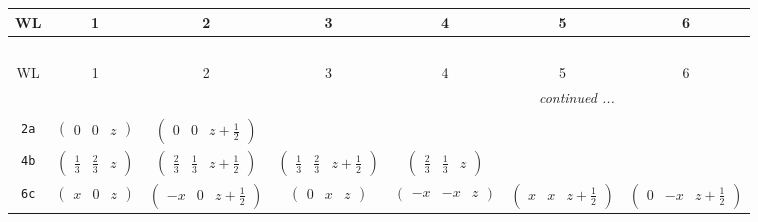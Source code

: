 \documentclass[fleqn,9pt,landscape]{jsarticle}
\begin{document}
\begin{center}
\renewcommand{\arraystretch}{1.2}
\begin{longtable}{ccccccc}
 \hline \hline
WL & 1 & 2 & 3 & 4 & 5 & 6 \\ \hline \endfirsthead

\multicolumn{6}{l}{\tablename\ \thetable{}} \\
 \hline \hline
WL & 1 & 2 & 3 & 4 & 5 & 6 \\ \hline \endhead

 \hline \hline
\multicolumn{6}{r}{\footnotesize\it continued ...} \\ \endfoot

 \hline \hline
\multicolumn{6}{r}{} \\ \endlastfoot

{\tt 2a} & $ \begin{pmatrix} 0 & 0 & z \end{pmatrix} $ & $ \begin{pmatrix} 0 & 0 & z + \frac{1}{2} \end{pmatrix} $ & $  $ & $  $ & $  $ & $  $ \\ \hline
{\tt 4b} & $ \begin{pmatrix} \frac{1}{3} & \frac{2}{3} & z \end{pmatrix} $ & $ \begin{pmatrix} \frac{2}{3} & \frac{1}{3} & z + \frac{1}{2} \end{pmatrix} $ & $ \begin{pmatrix} \frac{1}{3} & \frac{2}{3} & z + \frac{1}{2} \end{pmatrix} $ & $ \begin{pmatrix} \frac{2}{3} & \frac{1}{3} & z \end{pmatrix} $ & $  $ & $  $ \\ \hline
{\tt 6c} & $ \begin{pmatrix} x & 0 & z \end{pmatrix} $ & $ \begin{pmatrix} - x & 0 & z + \frac{1}{2} \end{pmatrix} $ & $ \begin{pmatrix} 0 & x & z \end{pmatrix} $ & $ \begin{pmatrix} - x & - x & z \end{pmatrix} $ & $ \begin{pmatrix} x & x & z + \frac{1}{2} \end{pmatrix} $ & $ \begin{pmatrix} 0 & - x & z + \frac{1}{2} \end{pmatrix} $ \\ \hline

\end{longtable}
\end{center}
\end{document}
